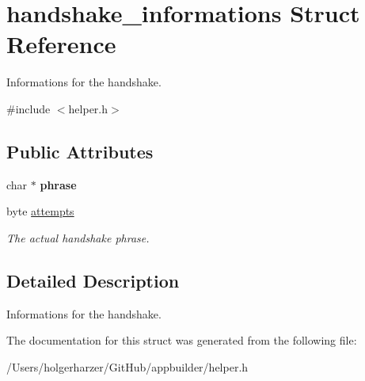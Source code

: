 \hypertarget{structhandshake__informations}{\section{handshake\+\_\+informations Struct Reference}
\label{structhandshake__informations}
}


Informations for the handshake.  




{\ttfamily \#include $<$helper.\+h$>$}

\subsection*{Public Attributes}
\begin{DoxyCompactItemize}
\item 
\hypertarget{structhandshake__informations_ad4f282832c3a4e2f59269a68c66ffd1b}{char $\ast$ {\bfseries phrase}}\label{structhandshake__informations_ad4f282832c3a4e2f59269a68c66ffd1b}

\item 
\hypertarget{structhandshake__informations_a728e648cbfb9fb7a1cf1bc97493a976c}{byte \hyperlink{structhandshake__informations_a728e648cbfb9fb7a1cf1bc97493a976c}{attempts}}\label{structhandshake__informations_a728e648cbfb9fb7a1cf1bc97493a976c}

\begin{DoxyCompactList}\small\item\em The actual handshake phrase. \end{DoxyCompactList}\end{DoxyCompactItemize}


\subsection{Detailed Description}
Informations for the handshake. 

The documentation for this struct was generated from the following file\+:\begin{DoxyCompactItemize}
\item 
/\+Users/holgerharzer/\+Git\+Hub/appbuilder/helper.\+h\end{DoxyCompactItemize}
